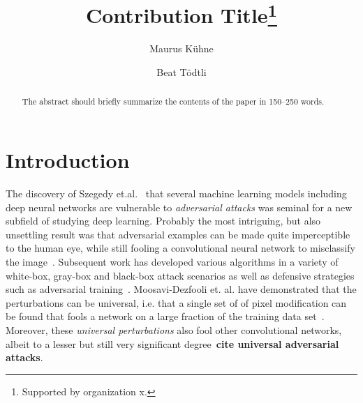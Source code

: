 \documentclass[runningheads]{llncs}
\begin{document}
%
\title{Contribution Title\thanks{Supported by organization x.}}
%
%
\author{Maurus K\"uhne \and
Beat Tödtli} %
%
%
%
\maketitle              %
%
\begin{abstract}
The abstract should briefly summarize the contents of the paper in
150--250 words.
\cite{yu_generating_2018}
\end{abstract}
%
%
%

\section{Introduction}
The discovery of Szegedy et.al.~\cite{Szegedy_2014} that several machine learning models including deep neural networks are vulnerable to \emph{adversarial attacks} was seminal for a new subfield of studying deep learning. Probably the most intriguing, but also unsettling result was that adversarial examples can be made quite imperceptible to the human eye, while still fooling a convolutional neural network to misclassify the image~\cite{goodfellow_2014}. Subsequent work has developed various algorithms in a variety of white-box, gray-box and black-box attack scenarios as well as defensive strategies such as adversarial training~\cite{REN2020346}. Moosavi-Dezfooli et. al. have demonstrated that the perturbations can be universal, i.e. that a single set of of pixel modification can be found that fools a network on a large fraction of the training data set~\cite{moosavi-dezfooli_universal_2017}. Moreover, these \emph{universal perturbations} also fool other convolutional networks, albeit to a lesser but still very significant degree~{\bf cite universal adversarial attacks}. 
\end{document}
